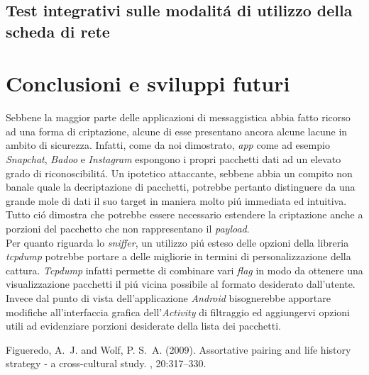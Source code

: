 \documentclass[12pt]{article} %
\begin{document}
\subsection{Test integrativi sulle modalit\'a di utilizzo della scheda di rete}



\section{Conclusioni e sviluppi futuri} %
Sebbene la maggior parte delle applicazioni di messaggistica abbia fatto ricorso ad una forma di criptazione, alcune di esse presentano ancora alcune lacune in ambito di sicurezza. Infatti, come da noi dimostrato, \textit{app} come ad esempio \textit{Snapchat}, \textit{Badoo} e \textit{Instagram} espongono i propri pacchetti dati ad un elevato grado di riconoscibilit\'a. Un ipotetico attaccante, sebbene abbia un compito non banale quale la decriptazione di pacchetti, potrebbe pertanto distinguere da una grande mole di dati il suo target in maniera molto pi\'u immediata ed intuitiva. Tutto ci\'o dimostra che potrebbe essere necessario estendere la criptazione anche a porzioni del pacchetto che non rappresentano il \textit{payload}.\\
Per quanto riguarda lo \textit{sniffer}, un utilizzo pi\'u esteso delle opzioni della libreria \textit{tcpdump} potrebbe portare a delle migliorie in termini di personalizzazione della cattura. \textit{Tcpdump} infatti permette di combinare vari \textit{flag} in modo da ottenere una visualizzazione pacchetti il pi\'u vicina possibile al formato desiderato dall'utente. Invece dal punto di vista dell'applicazione \textit{Android} bisognerebbe apportare modifiche all'interfaccia grafica dell'\textit{Activity} di filtraggio ed aggiungervi opzioni utili ad evidenziare porzioni desiderate della lista dei pacchetti.




\begin{thebibliography}{99} %

Figueredo, A.~J. and Wolf, P. S.~A. (2009).
\newblock Assortative pairing and life history strategy - a cross-cultural
  study.
, 20:317--330.
 
\end{thebibliography}

\end{document}
